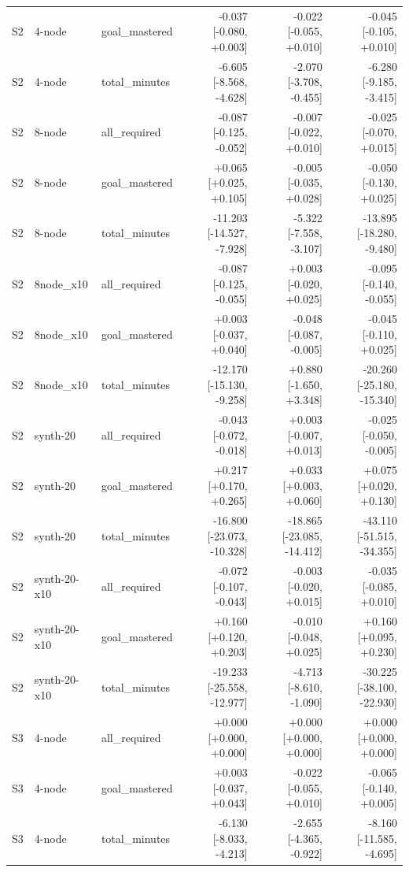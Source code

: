 \begin{table}[htbp]
\begin{tabular}{lllrrr}
S2 & 4-node & goal\_mastered & -0.037 [-0.080, +0.003] & -0.022 [-0.055, +0.010] & -0.045 [-0.105, +0.010] \\
S2 & 4-node & total\_minutes & -6.605 [-8.568, -4.628] & -2.070 [-3.708, -0.455] & -6.280 [-9.185, -3.415] \\
S2 & 8-node & all\_required & -0.087 [-0.125, -0.052] & -0.007 [-0.022, +0.010] & -0.025 [-0.070, +0.015] \\
S2 & 8-node & goal\_mastered & +0.065 [+0.025, +0.105] & -0.005 [-0.035, +0.028] & -0.050 [-0.130, +0.025] \\
S2 & 8-node & total\_minutes & -11.203 [-14.527, -7.928] & -5.322 [-7.558, -3.107] & -13.895 [-18.280, -9.480] \\
S2 & 8node\_x10 & all\_required & -0.087 [-0.125, -0.055] & +0.003 [-0.020, +0.025] & -0.095 [-0.140, -0.055] \\
S2 & 8node\_x10 & goal\_mastered & +0.003 [-0.037, +0.040] & -0.048 [-0.087, -0.005] & -0.045 [-0.110, +0.025] \\
S2 & 8node\_x10 & total\_minutes & -12.170 [-15.130, -9.258] & +0.880 [-1.650, +3.348] & -20.260 [-25.180, -15.340] \\
S2 & synth-20 & all\_required & -0.043 [-0.072, -0.018] & +0.003 [-0.007, +0.013] & -0.025 [-0.050, -0.005] \\
S2 & synth-20 & goal\_mastered & +0.217 [+0.170, +0.265] & +0.033 [+0.003, +0.060] & +0.075 [+0.020, +0.130] \\
S2 & synth-20 & total\_minutes & -16.800 [-23.073, -10.328] & -18.865 [-23.085, -14.412] & -43.110 [-51.515, -34.355] \\
S2 & synth-20-x10 & all\_required & -0.072 [-0.107, -0.043] & -0.003 [-0.020, +0.015] & -0.035 [-0.085, +0.010] \\
S2 & synth-20-x10 & goal\_mastered & +0.160 [+0.120, +0.203] & -0.010 [-0.048, +0.025] & +0.160 [+0.095, +0.230] \\
S2 & synth-20-x10 & total\_minutes & -19.233 [-25.558, -12.977] & -4.713 [-8.610, -1.090] & -30.225 [-38.100, -22.930] \\
S3 & 4-node & all\_required & +0.000 [+0.000, +0.000] & +0.000 [+0.000, +0.000] & +0.000 [+0.000, +0.000] \\
S3 & 4-node & goal\_mastered & +0.003 [-0.037, +0.043] & -0.022 [-0.055, +0.010] & -0.065 [-0.140, +0.005] \\
S3 & 4-node & total\_minutes & -6.130 [-8.033, -4.213] & -2.655 [-4.365, -0.922] & -8.160 [-11.585, -4.695] \\

\end{tabular}
\end{table}
